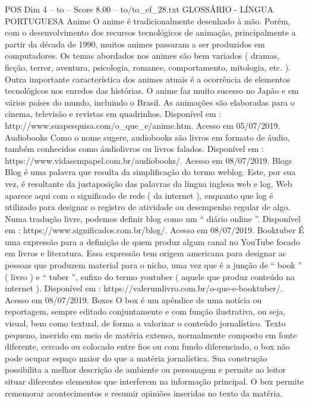 \begin{textsample}{POS Dim 4 – to – Score 8.00 – to/to\_ef\_28.txt}  \label{ex:f4_pos_205}
GLOSSÁRIO - LÍNGUA PORTUGUESA Anime O anime é tradicionalmente desenhado à mão.
Porém, com o desenvolvimento dos recursos tecnológicos de animação, principalmente a partir da década de 1990, muitos animes passaram a ser produzidos em computadores.
Os temas abordados nos animes são bem variados ( dramas, ficção, terror, aventura, psicologia, romance, comportamento, mitologia, etc. ).
Outra importante característica dos animes atuais é a ocorrência de elementos tecnológicos nos enredos das histórias.
O anime faz muito sucesso no Japão e em vários países do mundo, incluindo o Brasil.
As animações são elaboradas para o cinema, televisão e revistas em quadrinhos.
Disponível em : http://www.suapesquisa.com/o\_que\_e/anime.htm.
Acesso em 05/07/2019.
Audiobooks Como o nome sugere, audiobooks são livros em formato de áudio, também conhecidos como áudiolivros ou livros falados.
Disponível em : https://www.vidasempapel.com.br/audiobooks/.
Acesso em 08/07/2019.
Blogs Blog é uma palavra que resulta da simplificação do termo weblog.
Este, por sua vez, é resultante da justaposição das palavras da língua inglesa web e log.
Web aparece aqui com o significado de rede ( da internet ), enquanto que log é utilizado para designar o registro de atividade ou desempenho regular de algo.
Numa tradução livre, podemos definir blog como um “ diário online ”.
Disponível em : https://www.significados.com.br/blog/.
Acesso em 08/07/2019.
Booktuber É uma expressão para a definição de quem produz algum canal no YouTube focado em livros e literatura.
Essa expressão tem origem americana para designar as pessoas que produzem material para o nicho, uma vez que é a junção de “ book ” ( livro ) e “ tuber ”, sufixo do termo youtuber ( aquele que produz conteúdo na internet ).
Disponível em : https://valerumlivro.com.br/o-que-e-booktuber/.
Acesso em 08/07/2019.
Boxes O box é um apêndice de uma notícia ou reportagem, sempre editado conjuntamente e com função ilustrativa, ou seja, visual, bem como textual, de forma a valorizar o conteúdo jornalístico.
Texto pequeno, inserido em meio de matéria extensa, normalmente composto em fonte diferente, cercado ou colocado entre fios ou com fundo diferenciado, o box não pode ocupar espaço maior do que a matéria jornalística.
Sua construção possibilita a melhor descrição de ambiente ou personagem e permite ao leitor situar diferentes elementos que interferem na informação principal.
O box permite rememorar acontecimentos e resumir opiniões inseridas no texto da matéria.

\end{textsample}
